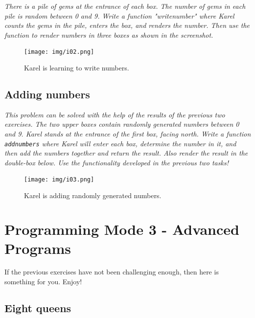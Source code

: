 {\em There is a pile of gems at the entrance of each box. The number of gems in each pile is random between 0 and 9. Write a function "writenumber" where Karel counts the gems in the pile, enters the box, and renders the number. Then use the function to render numbers in three boxes as shown in the screenshot. }


\begin{figure}[!ht]
\begin{center}
\texttt{[image: img/i02.png]}
\end{center}
\vspace{-4mm}
\caption{Karel is learning to write numbers.}
\label{fig:g11}
\vspace{-10mm}
\end{figure}



\subsection{Adding numbers}

\noindent
{\em This problem can be solved with the help of the results 
of the previous two exercises.
The two upper boxes contain randomly generated numbers between 0 and 9. Karel stands at the entrance of the first box,
facing north. Write a function {\tt addnumbers} where Karel will enter each box, determine the number in it,
and then add the numbers together and return the result. Also render the result in the double-box below. 
Use the functionality developed in the previous two tasks!}
\newpage

\begin{figure}[!ht]
\begin{center}
\texttt{[image: img/i03.png]}
\end{center}
\vspace{-4mm}
\caption{Karel is adding randomly generated numbers.}
\label{fig:g12}
\end{figure}


\section{Programming Mode 3 - Advanced Programs}

If the previous exercises have not been challenging enough, then here is something 
for you. Enjoy!

\subsection{Eight queens}

